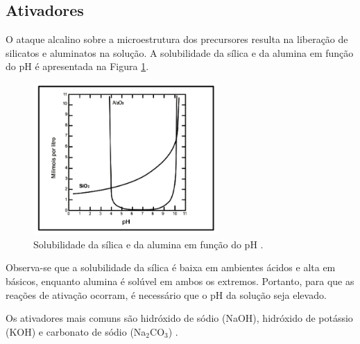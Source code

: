 

\subsection{Ativadores}

O ataque alcalino sobre a microestrutura dos precursores resulta na liberação de silicatos e aluminatos na solução.
A solubilidade da sílica e da alumina em função do pH é apresentada na Figura \ref{fig:solubilidade}.

\begin{figure}[ht]
  \centering
  \includegraphics[width=0.625\textwidth]{Cap2/solubilidade.png}
  \caption{Solubilidade da sílica e da alumina em função do pH \cite{mason1952principles}.}
  \label{fig:solubilidade}
\end{figure}

Observa-se que a solubilidade da sílica é baixa em ambientes ácidos e alta em básicos, enquanto alumina é solúvel em ambos os extremos.
Portanto, para que as reações de ativação ocorram, é necessário que o pH da solução seja elevado.

Os ativadores mais comuns são hidróxido de sódio (NaOH), hidróxido de potássio (KOH) e carbonato de sódio (Na$_2$CO$_3$) \cite{provis2009geopolymers}.